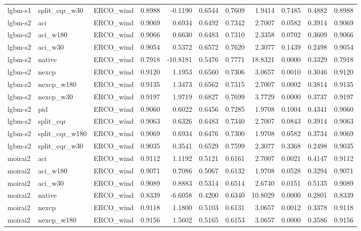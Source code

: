 \begin{tabular}{lllrrrrrrrr}
lgbm-s1 & split_cqr_w30 & ERCO_wind & 0.8988 & -0.1190 & 0.6544 & 0.7609 & 1.9414 & 0.7485 & 0.4882 & 0.8988 \\
lgbm-s2 & aci & ERCO_wind & 0.9069 & 0.6934 & 0.6492 & 0.7342 & 2.7007 & 0.0582 & 0.3914 & 0.9069 \\
lgbm-s2 & aci_w180 & ERCO_wind & 0.9066 & 0.6630 & 0.6483 & 0.7310 & 2.3358 & 0.0702 & 0.3609 & 0.9066 \\
lgbm-s2 & aci_w30 & ERCO_wind & 0.9054 & 0.5372 & 0.6572 & 0.7620 & 2.3077 & 0.1439 & 0.2498 & 0.9054 \\
lgbm-s2 & native & ERCO_wind & 0.7918 & -10.8181 & 0.5476 & 0.7771 & 18.8321 & 0.0000 & 0.3329 & 0.7918 \\
lgbm-s2 & nexcp & ERCO_wind & 0.9120 & 1.1953 & 0.6560 & 0.7306 & 3.0657 & 0.0010 & 0.3046 & 0.9120 \\
lgbm-s2 & nexcp_w180 & ERCO_wind & 0.9135 & 1.3473 & 0.6562 & 0.7315 & 2.7007 & 0.0002 & 0.3814 & 0.9135 \\
lgbm-s2 & nexcp_w30 & ERCO_wind & 0.9197 & 1.9719 & 0.6827 & 0.7699 & 3.7729 & 0.0000 & 0.3737 & 0.9197 \\
lgbm-s2 & pid & ERCO_wind & 0.9060 & 0.6022 & 0.6456 & 0.7285 & 1.9708 & 0.1004 & 0.4341 & 0.9060 \\
lgbm-s2 & split_cqr & ERCO_wind & 0.9063 & 0.6326 & 0.6483 & 0.7340 & 2.7007 & 0.0843 & 0.3914 & 0.9063 \\
lgbm-s2 & split_cqr_w180 & ERCO_wind & 0.9069 & 0.6934 & 0.6476 & 0.7300 & 1.9708 & 0.0582 & 0.3734 & 0.9069 \\
lgbm-s2 & split_cqr_w30 & ERCO_wind & 0.9035 & 0.3541 & 0.6529 & 0.7599 & 2.3077 & 0.3368 & 0.2498 & 0.9035 \\
moirai2 & aci & ERCO_wind & 0.9112 & 1.1192 & 0.5121 & 0.6161 & 2.7007 & 0.0021 & 0.4147 & 0.9112 \\
moirai2 & aci_w180 & ERCO_wind & 0.9071 & 0.7086 & 0.5067 & 0.6132 & 1.9708 & 0.0528 & 0.3294 & 0.9071 \\
moirai2 & aci_w30 & ERCO_wind & 0.9089 & 0.8883 & 0.5314 & 0.6514 & 2.6740 & 0.0151 & 0.5135 & 0.9089 \\
moirai2 & native & ERCO_wind & 0.8339 & -6.6058 & 0.4200 & 0.6340 & 10.8029 & 0.0000 & 0.2801 & 0.8339 \\
moirai2 & nexcp & ERCO_wind & 0.9118 & 1.1800 & 0.5103 & 0.6131 & 3.0657 & 0.0012 & 0.3378 & 0.9118 \\
moirai2 & nexcp_w180 & ERCO_wind & 0.9156 & 1.5602 & 0.5165 & 0.6153 & 3.0657 & 0.0000 & 0.3586 & 0.9156 \\

\end{tabular}
